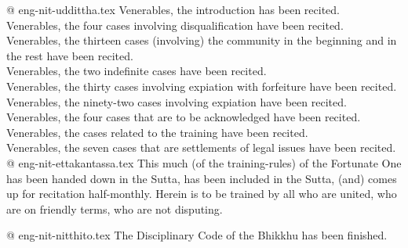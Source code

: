 @ eng-nit-uddittha.tex
Venerables, the introduction has been recited.\\
Venerables, the four cases involving disqualification have been recited.\\
Venerables, the thirteen cases (involving) the community in the beginning and in the rest have been recited.\\
Venerables, the two indefinite cases have been recited.\\
Venerables, the thirty cases involving expiation with forfeiture have been recited.\\
Venerables, the ninety-two cases involving expiation have been recited.\\
Venerables, the four cases that are to be acknowledged have been recited.\\
Venerables, the cases related to the training have been recited.\\
Venerables, the seven cases that are settlements of legal issues have been recited.\\

@ eng-nit-ettakantassa.tex
This much (of the training-rules) of the Fortunate One has been handed down in the Sutta, has been included in the Sutta, (and) comes up for recitation half-monthly. Herein is to be trained by all who are united, who are on friendly terms, who are not disputing.

@ eng-nit-nitthito.tex
The Disciplinary Code of the Bhikkhu has been finished.
